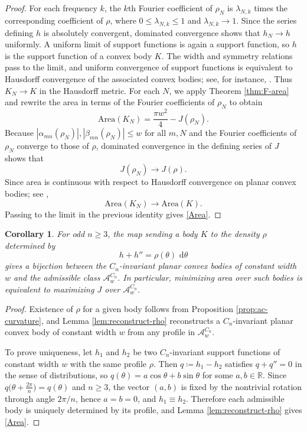 \documentclass[11pt,letterpaper,reqno]{amsart}
\newcommand{\R}{\mathbb{R}}
\newcommand{\dd}{\,\mathrm{d}}
\newtheorem{corollary}[theorem]{Corollary}
\providecommand{\R}{\mathbb{R}}
\providecommand{\Area}{\mathrm{Area}}
\begin{document}
\begin{proof}
For each frequency $k$, the $k$th Fourier coefficient of $\rho_N$ is $\lambda_{N,k}$ times the corresponding coefficient of $\rho$, where $0\le\lambda_{N,k}\le1$ and $\lambda_{N,k}\to1$. Since the series defining $h$ is absolutely convergent, dominated convergence shows that $h_N\to h$ uniformly. A uniform limit of support functions is again a support function, so $h$ is the support function of a convex body $K$. The width and symmetry relations pass to the limit, and uniform convergence of support functions is equivalent to Hausdorff convergence of the associated convex bodies; see, for instance, \cite[Chapter 1]{Schneider2014}. Thus $K_N\to K$ in the Hausdorff metric.
For each $N$, we apply Theorem \ref{thm:F-area} and rewrite the area in terms of the Fourier coefficients of $\rho_N$ to obtain
\[
\Area(K_N)=\frac{\pi w^2}{4}-J(\rho_N).
\]
Because $|\alpha_{mn}(\rho_N)|,|\beta_{mn}(\rho_N)|\le w$ for all $m,N$ and the Fourier coefficients of $\rho_N$ converge to those of $\rho$, dominated convergence in the defining series of $J$ shows that
\[
J(\rho_N)\to J(\rho).
\]
Since area is continuous with respect to Hausdorff convergence on planar convex bodies; see \cite[Chapter 1]{Schneider2014},
\[
\Area(K_N)\to \Area(K).
\]
Passing to the limit in the previous identity gives \eqref{Area}.
\end{proof}

\begin{corollary}
\label{cor:no-relaxation}
For odd $n\ge3$, the map sending a body $K$ to the density $\rho$ determined by
\[
h+h''=\rho(\theta)\,\dd\theta
\]
gives a bijection between the $C_n$-invariant planar convex bodies of constant width $w$ and the admissible class $\mathcal A_w^{C_n}$. In particular, minimizing area over such bodies is equivalent to maximizing $J$ over $\mathcal A_w^{C_n}$.
\end{corollary}

\begin{proof}
Existence of $\rho$ for a given body follows from Proposition \ref{prop:ac-curvature}, and Lemma \ref{lem:reconstruct-rho} reconstructs a $C_n$-invariant planar convex body of constant width $w$ from any profile in $\mathcal A_w^{C_n}$.

To prove uniqueness, let $h_1$ and $h_2$ be two $C_n$-invariant support functions of constant width $w$ with the same profile $\rho$. Then $q\coloneqq h_1-h_2$ satisfies $q+q''=0$ in the sense of distributions, so
$
q(\theta)=a\cos\theta+b\sin\theta
$
for some $a,b\in\R$. Since $q\bigl(\theta+\frac{2\pi}{n}\bigr)=q(\theta)$ and $n\ge3$, the vector $(a,b)$ is fixed by the nontrivial rotation through angle $2\pi/n$, hence $a=b=0$, and $h_1\equiv h_2$.
Therefore each admissible body is uniquely determined by its profile, and Lemma \ref{lem:reconstruct-rho} gives \eqref{Area}.
\end{proof}
\end{document}

